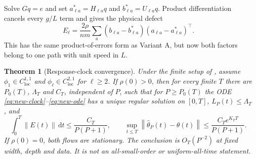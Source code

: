 \documentclass[11pt]{article}
\newtheorem{theorem}{Theorem}[section]
\theoremstyle{definition}
\theoremstyle{remark}
\newcommand{\norm}[1]{\left\lVert #1\right\rVert}
\newcommand{\dd}{\,\mathrm{d}}
\begin{document}
Solve $Gq=e$ and set $a^*_{\ell a}=H_{\ell a}q$ and
$b^*_{\ell a}=U_{\ell a}q$.  Product differentiation cancels every $g/L$
term and gives the physical defect
\begin{equation}
 E_\ell=\frac{2\rho}{nm}\sum_a
 (b_{\ell a}-b^*_{\ell a})(a_{\ell a}-a^*_{\ell a})^\top. \label{eq:new-defect}
\end{equation}
This has the same product-of-errors form as Variant A, but now both factors
belong to one path with unit speed in $L$.

\begin{theorem}[Response-clock convergence]
\label{thm:new}
Under the finite setup of , assume
$\phi_1\in C^{1,1}_{\mathrm{loc}}$ and
$\phi_\ell\in C^{2,1}_{\mathrm{loc}}$ for $\ell\ge2$.  If $\rho(0)>0$, then
for every finite $T$ there are $P_0(T)$, $\Lambda_T$ and $C_T$, independent
of $P$, such that for $P\ge P_0(T)$ the ODE
\eqref{eq:new-clock}--\eqref{eq:new-ode} has a unique regular solution on
$[0,T]$, $L_P(t)\le\Lambda_T$, and
\begin{equation}
 \int_0^T\norm{E(t)}\dd t\le\frac{C_T}{P(P+1)},\qquad
 \sup_{t\le T}\norm{\widehat\theta_P(t)-\theta(t)}
 \le\frac{C_Te^{K_TT}}{P(P+1)}.                      \label{eq:new-rate}
\end{equation}
If $\rho(0)=0$, both flows are stationary.  The conclusion is
$O_T(P^{-2})$ at fixed width, depth and data.  It is not an all-small-order or
uniform-all-time statement.
\end{theorem}
\end{document}
